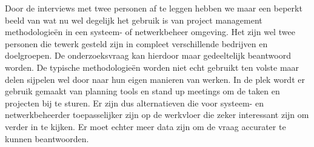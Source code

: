 \documentclass{hogent-article}
\begin{document}
    Door de interviews met twee personen af te leggen hebben we maar een beperkt beeld van wat nu wel degelijk het gebruik is van project management methodologieën in een systeem- of netwerkbeheer omgeving. Het zijn wel twee personen die tewerk gesteld zijn in compleet verschillende bedrijven en doelgroepen. De onderzoeksvraag kan hierdoor maar gedeeltelijk beantwoord worden. De typische methodologieën worden niet echt gebruikt ten volste maar delen sijpelen wel door naar hun eigen manieren van werken. In de plek wordt er gebruik gemaakt van planning tools en stand up meetings om de taken en projecten bij te sturen. Er zijn dus alternatieven die voor systeem- en netwerkbeheerder toepasselijker zijn op de werkvloer die zeker interessant zijn om verder in te kijken. Er moet echter meer data zijn om de vraag accurater te kunnen beantwoorden.
    


\printbibliography[heading=bibintoc]
\end{document}
